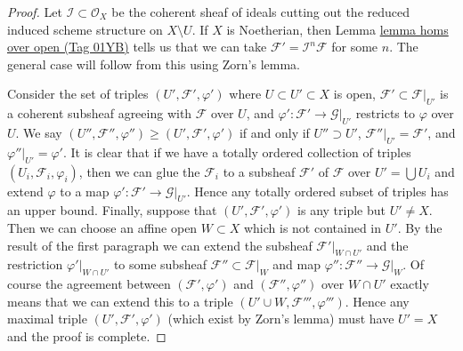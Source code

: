 \documentclass{amsart}
\theoremstyle{plain}
\theoremstyle{definition}
\theoremstyle{remark}
\numberwithin{equation}{subsection}
\begin{document}
\begin{proof}
Let $\mathcal{I} \subset \mathcal{O}_X$ be the coherent sheaf of ideals
cutting out the reduced induced scheme structure on $X \setminus U$.
If $X$ is Noetherian, then Lemma \href{https://stacks.math.columbia.edu/tag/01YB}{lemma homs over open (Tag 01YB)} tells us that
we can take $\mathcal{F}' = \mathcal{I}^n\mathcal{F}$
for some $n$. The general case will follow from this using Zorn's lemma.

\medskip\noindent
Consider the set of triples $(U', \mathcal{F}', \varphi')$ where
$U \subset U' \subset X$ is open, $\mathcal{F}' \subset \mathcal{F}|_{U'}$
is a coherent subsheaf agreeing with $\mathcal{F}$ over $U$, and
$\varphi' : \mathcal{F}' \to \mathcal{G}|_{U'}$ restricts to
$\varphi$ over $U$. We say
$(U'', \mathcal{F}'', \varphi'') \geq (U', \mathcal{F}', \varphi')$
if and only if $U'' \supset U'$, $\mathcal{F}''|_{U'} = \mathcal{F}'$,
and $\varphi''|_{U'} = \varphi'$.
It is clear that if we have a totally ordered collection
of triples $(U_i, \mathcal{F}_i, \varphi_i)$, then we
can glue the $\mathcal{F}_i$ to a subsheaf $\mathcal{F}'$ of $\mathcal{F}$
over $U' = \bigcup U_i$ and extend $\varphi$ to a map
$\varphi' : \mathcal{F}' \to \mathcal{G}|_{U'}$.
Hence any totally ordered subset of triples has an upper bound.
Finally, suppose that $(U', \mathcal{F}', \varphi')$
is any triple but $U' \not = X$. Then we can choose an
affine open $W \subset X$ which is not contained in $U'$.
By the result of the first paragraph we can extend
the subsheaf $\mathcal{F}'|_{W \cap U'}$ and the restriction
$\varphi'|_{W \cap U'}$ to some subsheaf $\mathcal{F}'' \subset \mathcal{F}|_W$
and map $\varphi'' : \mathcal{F}'' \to \mathcal{G}|_W$.
Of course the agreement between $(\mathcal{F}', \varphi')$ and
$(\mathcal{F}'', \varphi'')$ over $W \cap U'$ exactly means that
we can extend this to a triple $(U' \cup W, \mathcal{F}''', \varphi''')$.
Hence any maximal triple $(U', \mathcal{F}', \varphi')$
(which exist by Zorn's lemma) must have $U' = X$ and the
proof is complete.
\end{proof}
\end{document}
